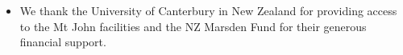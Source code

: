 \vspace{-1.75cm}
\begin{itemize}[itemsep=20pt]
\item[] We thank the University of Canterbury in New Zealand for providing
access to the Mt John facilities and the NZ Marsden Fund for their generous
financial support.
\end{itemize}
\vspace{-1.75cm}